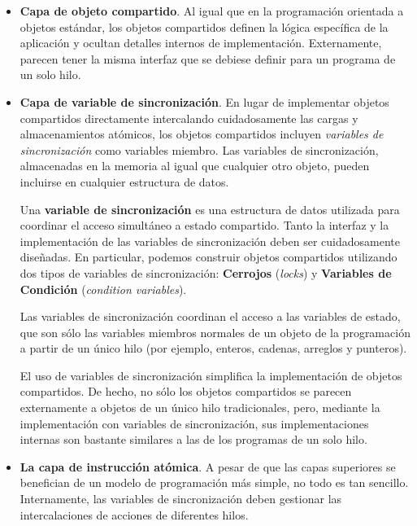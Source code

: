 \documentclass[10pt]{book}
\begin{document}
\begin{itemize}
\item \textbf{Capa de objeto compartido}. Al igual que en la programación orientada a objetos estándar, los objetos compartidos definen la lógica específica de la aplicación y ocultan detalles internos de implementación. Externamente, parecen tener la misma interfaz que se debiese definir para un programa de un solo hilo.

\item \textbf{Capa de variable de sincronización}. En lugar de implementar objetos compartidos directamente intercalando cuidadosamente las cargas y almacenamientos atómicos, los objetos compartidos incluyen \textit{variables de sincronización} como variables miembro. Las variables de sincronización, almacenadas en la memoria al igual que cualquier otro objeto, pueden incluirse en cualquier estructura de datos.

Una \textbf{variable de sincronización} es una estructura de datos utilizada para coordinar el acceso simultáneo a estado compartido. Tanto la interfaz y la implementación de las variables de sincronización deben ser cuidadosamente diseñadas. En particular, podemos construir objetos compartidos utilizando dos tipos de variables de sincronización: \textbf{Cerrojos} (\textit{locks}) y \textbf{Variables de Condición} (\textit{condition variables}).

Las variables de sincronización coordinan el acceso a las variables de estado, que son sólo las variables miembros normales de un objeto de la programación a partir de un único hilo (por ejemplo, enteros, cadenas, arreglos y punteros).

El uso de variables de sincronización simplifica la implementación de objetos compartidos. De hecho, no sólo los objetos compartidos se parecen externamente a objetos de un único hilo tradicionales, pero, mediante la implementación con variables de sincronización, sus implementaciones internas son bastante similares a las de los programas de un solo hilo.

\item \textbf{La capa de instrucción atómica}. A pesar de que las capas superiores se benefician de un modelo de programación más simple, no todo es tan sencillo. Internamente, las variables de sincronización deben gestionar las intercalaciones de acciones de diferentes hilos.


\end{itemize}
\end{document}
